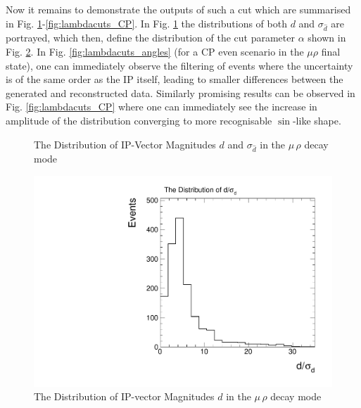 Now it remains to demonstrate the outputs of such a cut which are summarised in Fig. \ref{fig:lambda_dist}-\ref{fig:lambdacuts_CP}. In Fig. \ref{fig:lambda_dist} the distributions of both $d$ and $\sigma_{\hat{d}}$ are portrayed, which then, define the distribution of the cut parameter $\alpha$ shown in Fig. \ref{fig:IP_magOverLambda_dist}. In Fig. \ref{fig:lambdacuts_angles} (for a CP even scenario in the $\mu\rho$ final state), one can immediately observe the filtering of events where the uncertainty is of the same order as the IP itself, leading to smaller differences between the generated and reconstructed data. Similarly promising results can be observed in Fig. \ref{fig:lambdacuts_CP} where one can immediately see the increase in amplitude of the distribution converging to more recognisable $\sin$-like shape.\\
\begin{figure}[h]
	\centering
	\caption{The Distribution of IP-Vector Magnitudes $d$ and $\sigma_{\hat{d}}$ in the $\mu \, \rho$ decay mode}
	\label{fig:lambda_dist}
\end{figure}
\begin{figure}[h]
	\centering
	\includegraphics[width=0.7\linewidth]{Figures/IP_mag_IP_Over_err.pdf}
	\caption{The Distribution of IP-vector Magnitudes $d$ in the $\mu \, \rho$ decay mode}
	\label{fig:IP_magOverLambda_dist}
\end{figure}
